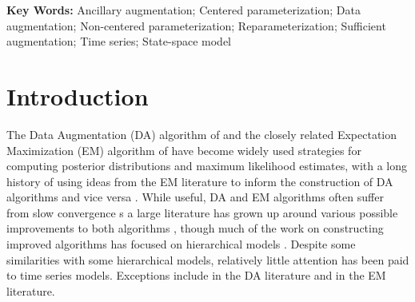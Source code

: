 \documentclass[12pt]{article}
\begin{document}
\noindent%
{\bf Key Words:} Ancillary augmentation; Centered parameterization; Data augmentation; Non-centered parameterization; Reparameterization; Sufficient augmentation; Time series; State-space model


\section{Introduction}

The Data Augmentation (DA) algorithm of \citet{tanner1987calculation} and the closely related Expectation Maximization (EM) algorithm of \citet{dempster1977maximum} have become widely used strategies for computing posterior distributions and maximum likelihood estimates, with a long history of using ideas from the EM literature to inform the construction of DA algorithms and vice versa \citep{meng1997algorithm,van2010cross}. While useful, DA and EM algorithms often suffer from slow convergence s a large literature has grown up around various possible improvements to both algorithms \citep{meng1997algorithm,meng1999seeking,liu1999parameter,hobert2008theoretical,yu2011center}, though much of the work on constructing improved algorithms has focused on hierarchical models \citep{gelfand1995efficient,roberts1997updating,meng1998fast,van2001art,bernardo2003non,papaspiliopoulos2007general,papaspiliopoulos2008stability}. Despite some similarities with some hierarchical models, relatively little attention has been paid to time series models. Exceptions include \citep{pitt1999analytic,fruhwirth2003bayesian,fruhwirth2006auxiliary} in the DA literature and\citep{van2003one} in the EM literature. 
\end{document}

